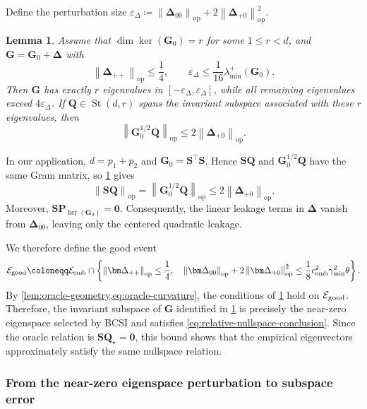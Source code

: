 \documentclass[11pt]{article}
\newtheorem{lemma}{Lemma}
\newcommand{\trans}{\top}
\newcommand{\opn}[1]{\left\lVert #1\right\rVert_{\mathrm{op}}}
\newcommand{\cE}{\mathcal{E}}
\newcommand{\gmin}{\gamma_{\min}}
\newcommand{\cemb}{c_{\mathrm{emb}}}
\begin{document}
Define the perturbation size
\(\varepsilon_\Delta
\coloneqq
\opn{\bm\Delta_{00}}
+2\opn{\bm\Delta_{+0}}^2\).
\begin{lemma}
\label{lem:nullspace}
Assume that $\dim\ker(\bm G_0)=r$ for some $1\le r< d$, and $\bm G = \bm G_0 + \bm \Delta$ with
\[
  \opn{\bm\Delta_{++}}\le\frac14,
  \qquad
  \varepsilon_\Delta
  \le\frac{1}{16}\lambda_{\min}^{+}(\bm G_0).
\]
Then $\bm G$ has exactly $r$ eigenvalues in
$[-\varepsilon_\Delta,\varepsilon_\Delta]$,
while all remaining eigenvalues exceed $4\varepsilon_\Delta$.
If $\bm Q\in\operatorname{St}(d,r)$ spans the invariant subspace
associated with these $r$ eigenvalues, then
\begin{equation}
\label{eq:abstract-relative-nullspace-conclusion}
  \opn{\bm G_0^{1/2}\bm Q}
  \le
  2\opn{\bm\Delta_{+0}}.
\end{equation}
\end{lemma}

In our application, $d=p_1+p_2$ and $\bm G_0=\bm S^\trans\bm S$. Hence
$\bm S\bm Q$ and $\bm G_0^{1/2}\bm Q$ have the same Gram matrix, so
\cref{lem:nullspace} gives
\begin{equation}
\label{eq:relative-nullspace-conclusion}
  \opn{\bm S\bm Q}
  =
  \opn{\bm G_0^{1/2}\bm Q}
  \le
  2\opn{\bm\Delta_{+0}}.
\end{equation}
Moreover, $\bm S\bm P_{\ker(\bm G_0)}=\bm 0$. Consequently, the linear
leakage terms in $\bm\Delta$ vanish from $\bm\Delta_{00}$, leaving only the
centered quadratic leakage.

We therefore define the good event
\begin{equation}
\label{eq:Egood}
  \cE_{\rm good}
  \coloneqq
  \cE_{\rm emb}
  \cap
  \left\{
    \opn{\bm\Delta_{++}}\le\frac14,\quad
    \opn{\bm\Delta_{00}}
    +2\opn{\bm\Delta_{+0}}^2
    \le
    \frac18\cemb^2\gmin^2\theta
  \right\}.
\end{equation}
By \cref{lem:oracle-geometry,eq:oracle-curvature}, the conditions of
\cref{lem:nullspace} hold on $\cE_{\rm good}$. Therefore, the invariant subspace of $\bm G$ identified in \cref{lem:nullspace} is
precisely the near-zero eigenspace selected by BCSI and satisfies
\cref{eq:relative-nullspace-conclusion}. Since the oracle relation is
$\bm S\bm Q_\star=\bm 0$, this bound shows that the empirical eigenvectors
approximately satisfy the same nullspace relation.

\subsubsection{From the near-zero eigenspace perturbation to subspace error}
\end{document}
